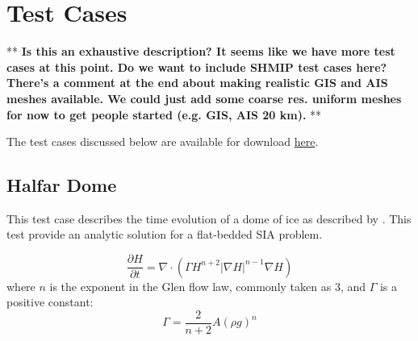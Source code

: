 \chapter{Test Cases}
\label{chap:landice_test_cases}

** \textbf{Is this an exhaustive description? It seems like we have more test cases at this point. Do we want to include SHMIP test cases here? There's a comment at the end about making realistic GIS and AIS meshes available. We could just add some coarse res. uniform meshes for now to get people started (e.g. GIS, AIS 20 km).} **


The test cases discussed below are available for download \href{http://mpas-dev.github.io/land_ice/download.html}{here}.



\FloatBarrier


\section{Halfar Dome}
\label{sec:halfar_description}
This test case describes the time evolution of a dome of ice as described by \citet{Halfar1983}.
This test provide an analytic solution for a flat-bedded SIA problem.

\begin{equation}
    \frac{\partial H}{\partial t} = \nabla \cdot (\Gamma H^{n+2} |\nabla H|^{n-1} \nabla H)
\end{equation}
where $n$ is the exponent in the Glen flow law, commonly taken as 3, and $\Gamma$ is a positive constant:
\begin{equation}
    \Gamma = \frac{2}{n+2} A (\rho g)^n
\end{equation}

